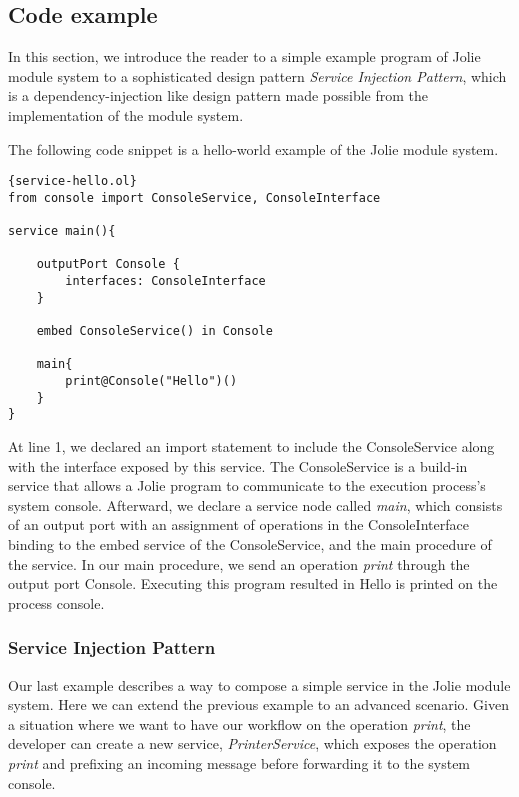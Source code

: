 \subsection{Code example}

In this section, we introduce the reader to a simple example program of Jolie module system to a sophisticated design pattern \textit{Service Injection Pattern}, which is a dependency-injection like design pattern made possible from the implementation of the module system.

The following code snippet is a hello-world example of the Jolie module system.

\begin{listing}[H]
    \lstset{language=Jolie,
        style=codeStyle,
        numbers=left,
        firstnumber=1
    }
    \begin{lstlisting}[frame=tlrb,
basicstyle=\footnotesize]{service-hello.ol}
from console import ConsoleService, ConsoleInterface

service main(){

    outputPort Console {
        interfaces: ConsoleInterface
    }

    embed ConsoleService() in Console

    main{
        print@Console("Hello")()
    }
}
\end{lstlisting}

\end{listing}

At line 1, we declared an import statement to include the ConsoleService along with the interface exposed by this service. The ConsoleService is a build-in service that allows a Jolie program to communicate to the execution process's system console. Afterward, we declare a service node called \textit{main}, which consists of an output port with an assignment of operations in the ConsoleInterface binding to the embed service of the ConsoleService, and the main procedure of the service. 
In our main procedure, we send an operation \textit{print} through the output port Console. Executing this program resulted in Hello is printed on the process console.

\subsubsection{Service Injection Pattern}

Our last example describes a way to compose a simple service in the Jolie module system. Here we can extend the previous example to an advanced scenario. Given a situation where we want to have our workflow on the operation \textit{print}, the developer can create a new service, \textit{PrinterService}, which exposes the operation \textit{print} and prefixing an incoming message before forwarding it to the system console.

